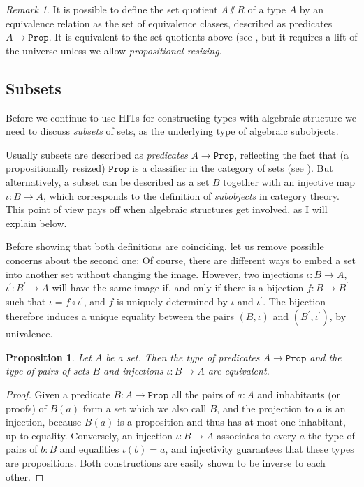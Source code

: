 \documentclass{amsart}
\theoremstyle{plain}
\numberwithin{equation}{section} %
\numberwithin{figure}{section} %
\theoremstyle{plain}
\theoremstyle{plain}
\theoremstyle{plain}
\theoremstyle{plain}
\theoremstyle{plain}
\newtheorem{prop}[thm]{Proposition} %
\theoremstyle{plain}
\theoremstyle{remark}
\newtheorem{rem}[thm]{Remark}
\theoremstyle{remark}
\theoremstyle{remark}
\begin{document}
\begin{rem}   %
It is possible to define the set quotient $A \sslash R$ of a type $A$ by an equivalence relation as the set of equivalence classes, described as predicates $A \rightarrow \mathtt{Prop}$. It is equivalent to the set quotients above (see \cite[Thm.6.10.6]{HoTTBook}, but it requires a lift of the universe unless we allow \textit{propositional resizing}.
\end{rem}


\subsection{Subsets}

Before we continue to use HITs for constructing types with algebraic structure we need to discuss \textit{subsets} of sets, as the underlying type of algebraic subobjects.

Usually subsets are described as \textit{predicates} $A \rightarrow \mathtt{Prop}$, reflecting the fact that (a propositionally resized) $\mathtt{Prop}$ is a classifier in the category of sets (see \cite[Thm.10.1.12]{HoTTBook}). But alternatively, a subset can be described as a set $B$ together with an injective map $\iota : B \rightarrow A$, which corresponds to the definition of \textit{subobjects} in category theory. This point of view pays off when algebraic structures get involved, as I will explain below. 

Before showing that both definitions are coinciding, let us remove possible concerns about the second one: Of course, there are different ways to embed a set into another set without changing the image. However, two injections $\iota : B \rightarrow A$, $\iota^\prime : B^\prime \rightarrow A$ will have the same image if, and only if there is a bijection $f : B \rightarrow B^\prime$ such that $\iota = f \circ \iota^\prime$, and $f$ is uniquely determined by $\iota$ and $\iota^\prime$. The bijection therefore induces a unique equality between the pairs $(B, \iota)$ and $(B^\prime, \iota^\prime)$, by univalence.

\begin{prop} \label{set-equiv-def-prop}   %
Let $A$ be a set. Then the type of predicates $A \rightarrow \mathtt{Prop}$ and the type of pairs of sets $B$ and injections $\iota : B \rightarrow A$ are equivalent. 
\end{prop}
\begin{proof}
Given a predicate $B : A \rightarrow \mathtt{Prop}$ all the pairs of $a : A$ and inhabitants (or proofs) of $B(a)$ form a set which we also call $B$, and the projection to $a$ is an injection, because $B(a)$ is a proposition and thus has at most one inhabitant, up to equality. Conversely, an injection $\iota : B \rightarrow A$ associates to every $a$ the type of pairs of $b : B$ and equalities $\iota(b) = a$, and injectivity guarantees that these types are propositions. Both constructions are easily shown to be inverse to each other. 
\end{proof}
\end{document}
